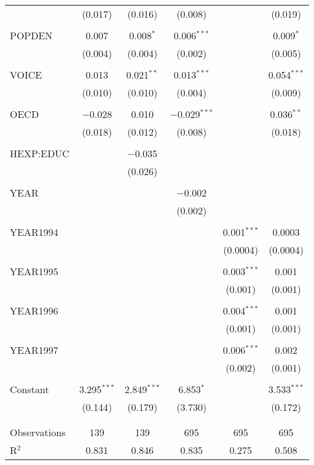 \documentclass[12pt,a4paper]{article}\usepackage[]{graphicx}\usepackage[]{color}
\begin{document}
\begin{table}[!htbp]
\begin{tabular}{@{\extracolsep{5pt}}lccccc}
  & (0.017) & (0.016) & (0.008) &  & (0.019) \\ 
  & & & & & \\ 
 POPDEN & 0.007 & 0.008$^{*}$ & 0.006$^{***}$ &  & 0.009$^{*}$ \\ 
  & (0.004) & (0.004) & (0.002) &  & (0.005) \\ 
  & & & & & \\ 
 VOICE & 0.013 & 0.021$^{**}$ & 0.013$^{***}$ &  & 0.054$^{***}$ \\ 
  & (0.010) & (0.010) & (0.004) &  & (0.009) \\ 
  & & & & & \\ 
 OECD & $-$0.028 & 0.010 & $-$0.029$^{***}$ &  & 0.036$^{**}$ \\ 
  & (0.018) & (0.012) & (0.008) &  & (0.018) \\ 
  & & & & & \\ 
 HEXP:EDUC &  & $-$0.035 &  &  &  \\ 
  &  & (0.026) &  &  &  \\ 
  & & & & & \\ 
 YEAR &  &  & $-$0.002 &  &  \\ 
  &  &  & (0.002) &  &  \\ 
  & & & & & \\ 
 YEAR1994 &  &  &  & 0.001$^{***}$ & 0.0003 \\ 
  &  &  &  & (0.0004) & (0.0004) \\ 
  & & & & & \\ 
 YEAR1995 &  &  &  & 0.003$^{***}$ & 0.001 \\ 
  &  &  &  & (0.001) & (0.001) \\ 
  & & & & & \\ 
 YEAR1996 &  &  &  & 0.004$^{***}$ & 0.001 \\ 
  &  &  &  & (0.001) & (0.001) \\ 
  & & & & & \\ 
 YEAR1997 &  &  &  & 0.006$^{***}$ & 0.002 \\ 
  &  &  &  & (0.002) & (0.001) \\ 
  & & & & & \\ 
 Constant & 3.295$^{***}$ & 2.849$^{***}$ & 6.853$^{*}$ &  & 3.533$^{***}$ \\ 
  & (0.144) & (0.179) & (3.730) &  & (0.172) \\ 
  & & & & & \\ 
\hline \\[-1.8ex] 
Observations & 139 & 139 & 695 & 695 & 695 \\ 
R$^{2}$ & 0.831 & 0.846 & 0.835 & 0.275 & 0.508 \\ 

\end{tabular}
\end{table}
\end{document}
